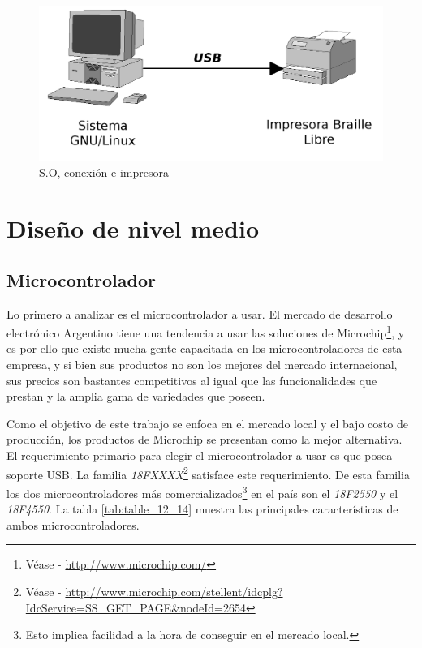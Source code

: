 \begin{figure}[htp]
\centering
\includegraphics[width=13cm]{./img/pc_usb_printer.png}
\caption{S.O, conexi\'on e impresora}
\label{fig:pc_usb_printer}
\end{figure}

\section{Dise\~no de nivel medio}
%
\subsection{Microcontrolador}
Lo primero a analizar es el microcontrolador a usar. El mercado de
desarrollo electr\'onico Argentino tiene una tendencia a usar las soluciones de
Microchip\footnote{V\'ease - \url{http://www.microchip.com/}}, y es por ello
que existe mucha gente capacitada en los microcontroladores de esta empresa, y
si bien sus productos no son los mejores del mercado internacional, sus
precios son bastantes competitivos al igual que las funcionalidades que
prestan y la amplia gama de variedades que poseen.\

Como el objetivo de este trabajo se enfoca en el mercado local y el bajo costo
de producci\'on, los productos de Microchip se presentan como la mejor
alternativa.\\

El requerimiento primario para elegir el microcontrolador a usar es que posea
soporte USB. La familia \emph{18FXXXX}\footnote{V\'ease - \url{
http://www.microchip.com/stellent/idcplg?IdcService=SS_GET_PAGE&nodeId=2654}}
satisface este requerimiento. De esta familia los dos microcontroladores m\'as
comercializados\footnote{Esto implica facilidad a la hora de conseguir en el
mercado local.} en el pa\'is son el \emph{18F2550} y el \emph{18F4550}. La
tabla \ref{tab:table_12_14} muestra las principales caracter\'isticas de ambos
microcontroladores.


